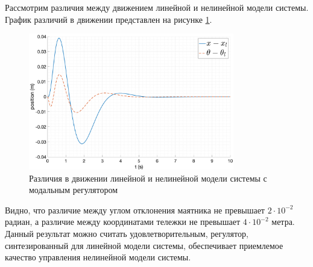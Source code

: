 Рассмотрим различия между движением линейной и нелинейной модели системы. График различий в движении
представлен на рисунке \ref{fig:modal_control_cmp}.
\begin{figure}[ht!]
    \centering
    \includegraphics[width=0.8\textwidth]{media/plots/modal_control/cmp_0.png}
    \caption{Различия в движении линейной и нелинейной модели системы с модальным регулятором}
    \label{fig:modal_control_cmp}
\end{figure}
Видно, что различие между углом отклонения маятника не превышает $2 \cdot 10^{-2}$ радиан, а различие между
координатами тележки не превышает $4\cdot10^{-2}$ метра. Данный результат можно считать удовлетворительным, 
регулятор, синтезированный для линейной модели системы, обеспечивает приемлемое качество управления 
нелинейной модели системы. 

\FloatBarrier
